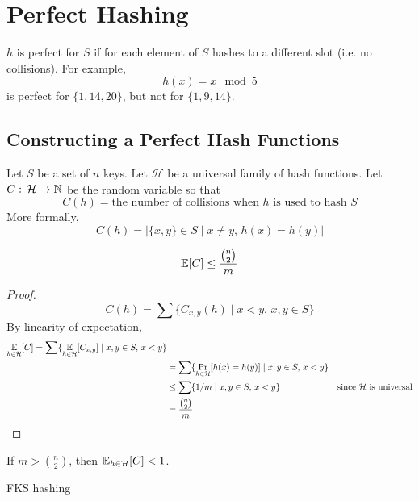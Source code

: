 \section{Perfect Hashing}

$h$ is perfect for $S$ if for each element of $S$ hashes to a different slot (i.e. no collisions). For example,
$$
h(x) = x \mod 5
$$
is perfect for $\{1,14,20\}$, but not for $\{1,9,14\}$.

\subsection{Constructing a Perfect Hash Functions}

Let $S$ be a set of $n$ keys. Let $\mathcal{H}$ be a universal family of hash functions. Let $C:\, \mathcal{H}\to\mathbb{N}$ be the random variable so that
$$
C(h) = \text{the number of collisions when $h$ is used to hash $S$}
$$
More formally,
$$
C(h) = \left| \{x,y\} \in S \mid x \neq y,\, h(x)=h(y) \right|
$$

\begin{lemma}
    $$
    \operatorname*{\mathbb{E}}[C] \leq \frac{{n \choose 2}}{m}
    $$
\end{lemma}

\begin{proof}
    $$C(h) = \sum \{ C_{x,y}(h) \mid x<y,\, x,y \in S \}$$
    By linearity of expectation,
    $$
    \begin{aligned}
        \operatorname*{\mathbb{E}}_{h \in \mathcal{H}} [C] = \sum \{ \operatorname*{\mathbb{E}}_{h \in \mathcal{H} } [C_{x,y}] \mid x,y \in S,\, x < y\} \\
        &= \sum \{ \Pr_{h \in \mathcal{H}} [h(x)=h(y)] \mid x,y\in S,\, x<y\} \\
        &\leq \sum \{1/m \mid x,y \in S,\, x<y \} & \text{since $\mathcal{H}$ is universal} \\
        &= \frac{{n \choose 2}}{m}
    \end{aligned}
    $$
\end{proof}

If $m > {n \choose 2}$, then $\operatorname*{\mathbb{E}}_{h \in \mathcal{H}}[C] < 1$.

FKS hashing